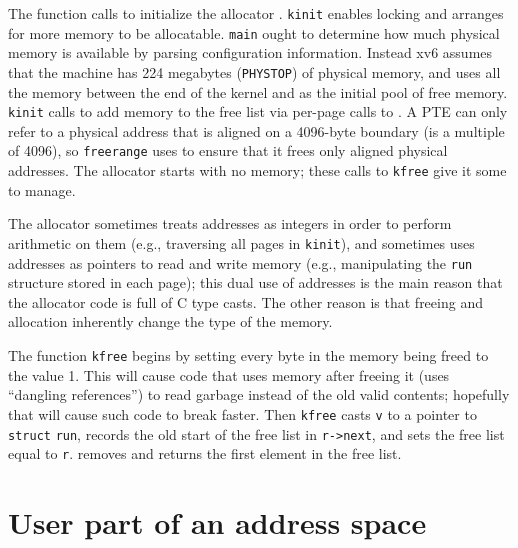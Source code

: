 The function
calls
to initialize the allocator
.
\lstinline{kinit}
enables locking and arranges for more memory to be allocatable.
\lstinline{main}
ought to determine how much physical
memory is available by parsing configuration information.
Instead xv6 assumes that the machine has
224 megabytes
(\lstinline{PHYSTOP})
of physical memory, and uses all the memory between the end of the kernel
and
as the initial pool of free memory.
\lstinline{kinit}
calls
to add memory to the free list via per-page calls to
.
A PTE can only refer to a physical address that is aligned
on a 4096-byte boundary (is a multiple of 4096), so
\lstinline{freerange}
uses
to ensure that it frees only aligned physical addresses.
The allocator starts with no memory;
these calls to
\lstinline{kfree}
give it some to manage.

The allocator sometimes treats addresses as integers
in order to perform arithmetic on them (e.g.,
traversing all pages in
\lstinline{kinit}),
and sometimes uses addresses as pointers to read and
write memory (e.g., manipulating the
\lstinline{run}
structure stored in each page);
this dual use of addresses is the main reason that the
allocator code is full of C type casts.
The other reason is that freeing and allocation inherently
change the type of the memory.

The function
\lstinline{kfree}
begins by setting every byte in the
memory being freed to the value 1.
This will cause code that uses memory after freeing it
(uses ``dangling references'')
to read garbage instead of the old valid contents;
hopefully that will cause such code to break faster.
Then
\lstinline{kfree}
casts
\lstinline{v}
to a pointer to
\lstinline{struct}
\lstinline{run},
records the old start of the free list in
\lstinline{r->next},
and sets the free list equal to
\lstinline{r}.
removes and returns the first element in the free list.
\section{User part of an address space}

